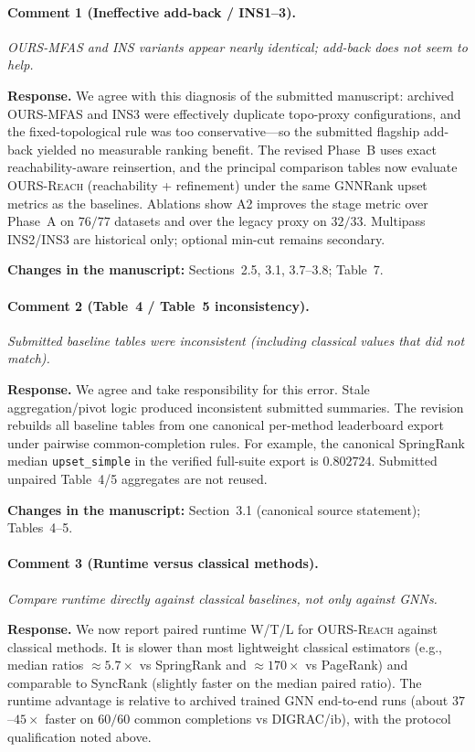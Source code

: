 \documentclass[11pt]{article}
\newcommand{\commentbox}[1]{\par\textit{#1}\par\medskip}
\newcommand{\changes}[1]{\textbf{Changes in the manuscript:} #1\par\medskip}
\begin{document}
\paragraph{Comment 1 (Ineffective add-back / INS1--3).}
\commentbox{OURS-MFAS and INS variants appear nearly identical; add-back does not seem to help.}

\noindent\textbf{Response.}
We agree with this diagnosis of the submitted manuscript: archived \textsc{OURS-MFAS} and \textsc{INS3} were effectively duplicate topo-proxy configurations, and the fixed-topological rule was too conservative---so the submitted flagship add-back yielded no measurable ranking benefit. The revised Phase~B uses exact reachability-aware reinsertion, and the principal comparison tables now evaluate \textsc{OURS-Reach} (reachability + refinement) under the same GNNRank upset metrics as the baselines. Ablations show A2 improves the stage metric over Phase~A on $76/77$ datasets and over the legacy proxy on $32/33$. Multipass INS2/INS3 are historical only; optional min-cut remains secondary.

\changes{Sections~2.5, 3.1, 3.7--3.8; Table~7.}

\paragraph{Comment 2 (Table~4 / Table~5 inconsistency).}
\commentbox{Submitted baseline tables were inconsistent (including classical values that did not match).}

\noindent\textbf{Response.}
We agree and take responsibility for this error. Stale aggregation/pivot logic produced inconsistent submitted summaries. The revision rebuilds all baseline tables from one canonical per-method leaderboard export under pairwise common-completion rules. For example, the canonical SpringRank median \texttt{upset\_simple} in the verified full-suite export is $0.802724$. Submitted unpaired Table~4/5 aggregates are not reused.

\changes{Section~3.1 (canonical source statement); Tables~4--5.}

\paragraph{Comment 3 (Runtime versus classical methods).}
\commentbox{Compare runtime directly against classical baselines, not only against GNNs.}

\noindent\textbf{Response.}
We now report paired runtime W/T/L for \textsc{OURS-Reach} against classical methods. It is slower than most lightweight classical estimators (e.g., median ratios $\approx 5.7\times$ vs SpringRank and $\approx 170\times$ vs PageRank) and comparable to SyncRank (slightly faster on the median paired ratio). The runtime advantage is relative to archived trained GNN end-to-end runs (about $37$--$45\times$ faster on $60/60$ common completions vs DIGRAC/ib), with the protocol qualification noted above.
\end{document}
